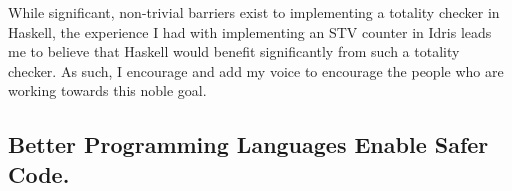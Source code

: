 
While significant, non-trivial barriers exist to implementing a totality checker
in Haskell, the experience I had with implementing an STV counter in Idris leads
me to believe that Haskell would benefit significantly from such a totality
checker. As such, I encourage and add my voice to encourage the people who are
working towards this noble goal. 

\subsection{Better Programming Languages Enable Safer Code.}